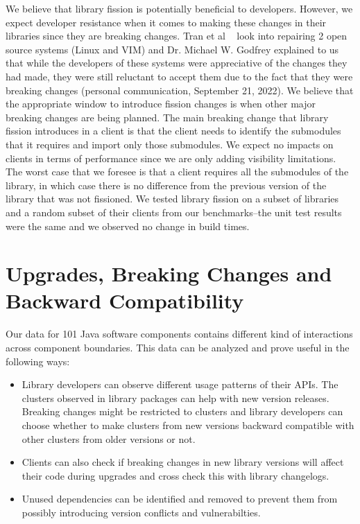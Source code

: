 We believe that library fission is potentially beneficial to developers. However, we expect developer resistance when it comes to making these changes in their libraries since they are breaking changes. Tran et al ~\cite{tran2000architectural} look into repairing 2 open source systems (Linux and VIM) and Dr. Michael W. Godfrey explained to us that while the developers of these systems were appreciative of the changes they had made, they were still reluctant to accept them due to the fact that they were breaking changes (personal communication, September 21, 2022). We believe that the appropriate window to introduce fission changes is when other major breaking changes are being planned. The main breaking change that library fission introduces in a client is that the client needs to identify the submodules that it requires and import only those submodules. We expect no impacts on clients in terms of performance since we are only adding visibility limitations. The worst case that we foresee is that a client requires all the submodules of the library, in which case there is no difference from the previous version of the library that was not fissioned. We tested library fission on a subset of libraries and a random subset of their clients from our benchmarks--the unit test results were the same and we observed no change in build times.



\section{Upgrades, Breaking Changes and Backward Compatibility}
Our data for 101 Java software components contains different kind of interactions across component boundaries. This data can be analyzed and prove useful in the following ways:
\begin{itemize}
\item Library developers can observe different usage patterns of their APIs. The clusters observed in library packages can help with new version releases. Breaking changes might be restricted to clusters and library developers can choose whether to make clusters from new versions backward compatible with other clusters from older versions or not. 
\item Clients can also check if breaking changes in new library versions will affect their code during upgrades and cross check this with library changelogs. 
\item Unused dependencies can be identified and removed to prevent them from possibly introducing version conflicts and vulnerabilties.
\end{itemize}